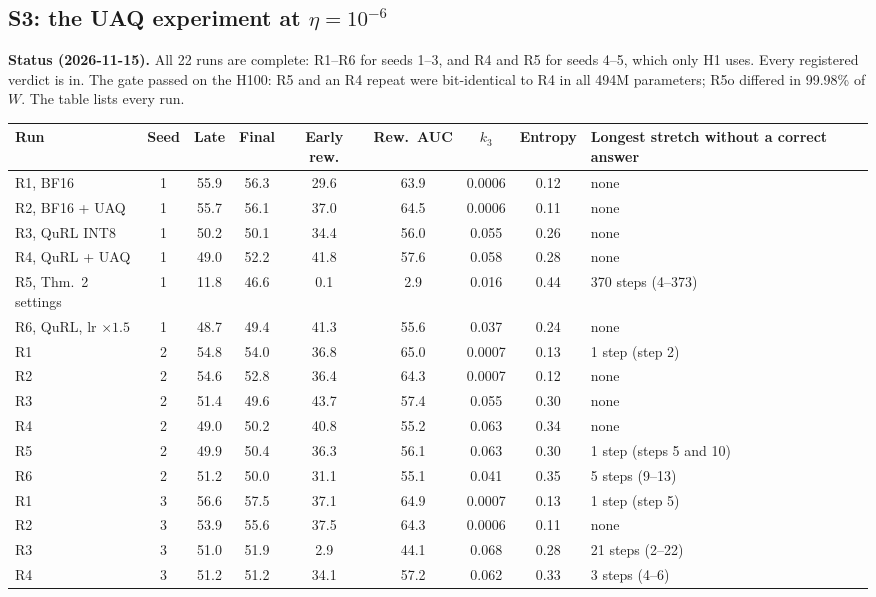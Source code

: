 \documentclass[11pt]{article}
\begin{document}
\subsection{S3: the UAQ experiment at \texorpdfstring{$\eta=10^{-6}$}{eta = 1e-6}}\label{sec:uaq-results}
\textbf{Status (2026-11-15).} All 22 runs are complete: R1--R6 for seeds 1--3, and R4 and R5 for seeds 4--5, which only H1 uses. Every registered verdict is in. The gate passed on the H100: R5 and an R4 repeat were bit-identical to R4 in all 494M parameters; R5o differed in 99.98\% of $W$. The table lists every run.
\begin{table}[tbp]
\centering\footnotesize
\begin{tabularx}{\linewidth}{@{}l c c c c c c c L@{}}
\toprule
Run & Seed & Late & Final & Early rew. & Rew.\ AUC & $k_3$ & Entropy & Longest stretch without a correct answer\\
\midrule
R1, BF16 & 1 & 55.9 & 56.3 & 29.6 & 63.9 & 0.0006 & 0.12 & none\\
R2, BF16 + UAQ & 1 & 55.7 & 56.1 & 37.0 & 64.5 & 0.0006 & 0.11 & none\\
R3, QuRL INT8 & 1 & 50.2 & 50.1 & 34.4 & 56.0 & 0.055 & 0.26 & none\\
R4, QuRL + UAQ & 1 & 49.0 & 52.2 & 41.8 & 57.6 & 0.058 & 0.28 & none\\
R5, Thm.~2 settings & 1 & 11.8 & 46.6 & 0.1 & 2.9 & 0.016 & 0.44 & 370 steps (4--373)\\
R6, QuRL, lr $\times1.5$ & 1 & 48.7 & 49.4 & 41.3 & 55.6 & 0.037 & 0.24 & none\\
\midrule
R1 & 2 & 54.8 & 54.0 & 36.8 & 65.0 & 0.0007 & 0.13 & 1 step (step 2)\\
R2 & 2 & 54.6 & 52.8 & 36.4 & 64.3 & 0.0007 & 0.12 & none\\
R3 & 2 & 51.4 & 49.6 & 43.7 & 57.4 & 0.055 & 0.30 & none\\
R4 & 2 & 49.0 & 50.2 & 40.8 & 55.2 & 0.063 & 0.34 & none\\
R5 & 2 & 49.9 & 50.4 & 36.3 & 56.1 & 0.063 & 0.30 & 1 step (steps 5 and 10)\\
R6 & 2 & 51.2 & 50.0 & 31.1 & 55.1 & 0.041 & 0.35 & 5 steps (9--13)\\
\midrule
R1 & 3 & 56.6 & 57.5 & 37.1 & 64.9 & 0.0007 & 0.13 & 1 step (step 5)\\
R2 & 3 & 53.9 & 55.6 & 37.5 & 64.3 & 0.0006 & 0.11 & none\\
R3 & 3 & 51.0 & 51.9 & 2.9 & 44.1 & 0.068 & 0.28 & 21 steps (2--22)\\
R4 & 3 & 51.2 & 51.2 & 34.1 & 57.2 & 0.062 & 0.33 & 3 steps (4--6)\\

\end{tabularx}
\end{table}
\end{document}
